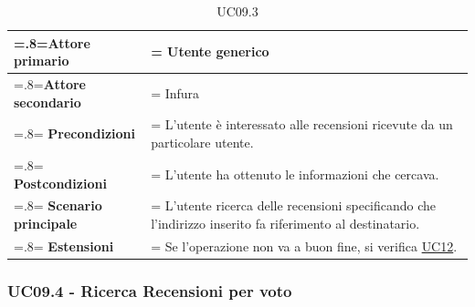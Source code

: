             \begin{table}[H]
                \centering
                \renewcommand{\arraystretch}{1.8}
                \renewcommand\tabularxcolumn[1]{m{#1}}
                \begin{tabularx}{0.9\textwidth} {
                    >{\hsize=.8\hsize\linewidth=\hsize}X
                    >{\hsize=1.2\hsize\linewidth=\hsize}X}
                    \hline
                    \textbf{Attore primario} & Utente generico \\
                    \hline
                    \textbf{Attore secondario} & Infura \\
                    \hline
                    \textbf{Precondizioni} & L'utente è interessato alle recensioni ricevute da un particolare utente. \\
                    \hline
                    \textbf{Postcondizioni} & L'utente ha ottenuto le informazioni che cercava. \\
                    \hline
                    \textbf{Scenario principale} & L'utente ricerca delle recensioni specificando che l'indirizzo inserito fa riferimento al destinatario.\\
                    \hline
                    \textbf{Estensioni} & Se l'operazione non va a buon fine, si verifica \hyperref[UC12]{UC12}. \\
                    \hline
                \end{tabularx}
                \caption{UC09.3}
            \end{table}

        \subsubsection{UC09.4 - Ricerca Recensioni per voto}
        \label{UC09.4}

